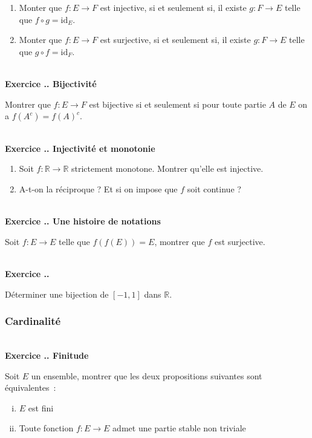 \documentclass{article}
\newcommand{\mb}[1]{\mathbb{#1}}
\newcounter{exo}
\newcommand{\exercice}[1][\null]{\textbf{\\ Exercice \thesection.\theexo. #1} \addtocounter{exo}{1}}
\begin{document}
\begin{enumerate}

\item Monter que $f : E \rightarrow F$ est injective, si et seulement si, il existe $g : F \rightarrow E$ telle que $f \circ g = \text{id}_E$.

\item Monter que $f : E \rightarrow F$ est surjective, si et seulement si, il existe $g : F \rightarrow E$ telle que $g \circ f = \text{id}_F$.

\end{enumerate}



\exercice[Bijectivité]

Montrer que $f : E \to F$ est bijective si et seulement 
si pour toute partie $A$ de $E$ on a $f(A^c) = f(A)^c$.

\exercice[Injectivité et monotonie]

\begin{enumerate}

\item Soit $f : \mb{R} \rightarrow \mb{R}$ strictement monotone. Montrer qu'elle est injective.

\item A-t-on la réciproque ? Et si on impose que $f$ soit continue ?

\end{enumerate}



\exercice[Une histoire de notations]

Soit $f : E \to E$ telle que $f(f(E)) = E$,
montrer que $f$ est surjective.

\exercice 

Déterminer une bijection de $[-1,1]$ dans $\mb{R}$.





\subsubsection{Cardinalité}

\exercice[Finitude]

Soit $E$ un ensemble, montrer que les deux propositions suivantes 
sont équivalentes~:

\begin{enumerate}[(i)]
    \item $E$ est fini
    \item Toute fonction $f : E \to E$ admet une partie stable non 
        triviale
\end{enumerate}
\end{document}
